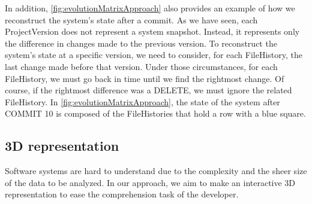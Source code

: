In addition, \autoref{fig:evolutionMatrixApproach} also provides an example of how we reconstruct the system's state after a commit. 
As we have seen, each ProjectVersion does not represent a system snapshot.
Instead, it represents only the difference in changes made to the previous version. 
To reconstruct the system's state at a specific version, we need to consider, for each FileHistory, the last change made before that version. 
Under those circumstances, for each FileHistory, we must go back in time until we find the rightmost change. Of course, if the rightmost difference was a DELETE, we must ignore the related FileHistory.
In \autoref{fig:evolutionMatrixApproach}, the state of the system after COMMIT 10 is composed of the FileHistories that hold a row with a blue square. 



\subsection{3D representation}
\label{s:3DRepr}

Software systems are hard to understand due to the complexity and the sheer size of the data to be analyzed.
In our approach, we aim to make an interactive 3D representation to ease the comprehension task of the developer. 
\bigbreak

